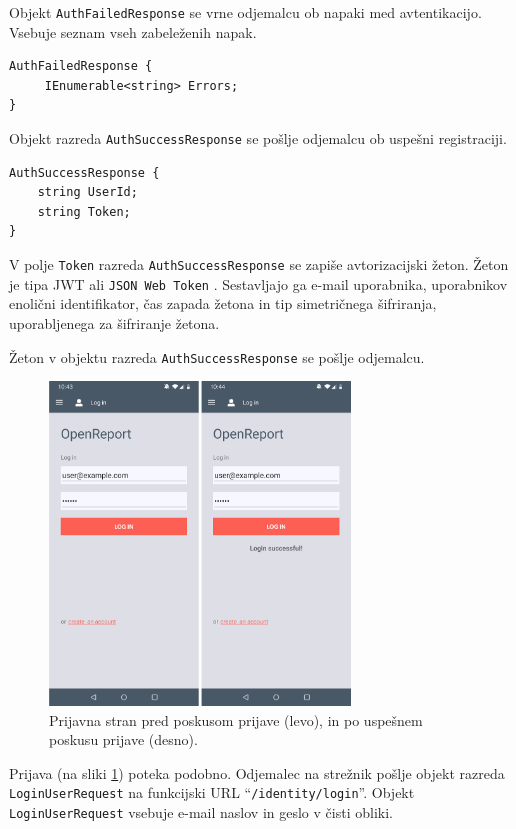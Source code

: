 \documentclass[a4paper, 12pt]{book}
\begin{document}
Objekt \texttt{AuthFailedResponse} se vrne odjemalcu ob napaki med avtentikacijo.
Vsebuje seznam vseh zabeleženih napak.

\begin{verbatim}
AuthFailedResponse { 
     IEnumerable<string> Errors; 
}
\end{verbatim}

Objekt razreda \texttt{AuthSuccessResponse} se pošlje odjemalcu ob uspešni registraciji.

\begin{verbatim}
AuthSuccessResponse { 
    string UserId; 
    string Token; 
} 
\end{verbatim}

V polje \texttt{Token} razreda \texttt{AuthSuccessResponse} se zapiše avtorizacijski žeton.
Žeton je tipa JWT ali \texttt{JSON Web Token} \cite{jwtinfo}.
Sestavljajo ga e-mail uporabnika, uporabnikov enolični identifikator, čas zapada žetona in tip simetričnega šifriranja, uporabljenega za šifriranje žetona.

Žeton v objektu razreda \texttt{AuthSuccessResponse} se pošlje odjemalcu.

\clearpage

\begin{figure}[H]
\begin{center}
\includegraphics[width=8cm]{app_login}
\end{center}
	\caption{Prijavna stran pred poskusom prijave (levo), in po uspešnem poskusu prijave (desno).}
\label{app_login}
\end{figure}

Prijava (na sliki \ref{app_login}) poteka podobno.
Odjemalec na strežnik pošlje objekt razreda \texttt{LoginUserRequest} na funkcijski URL \enquote{\texttt{/identity/login}}.
Objekt \texttt{LoginUserRequest} vsebuje e-mail naslov in geslo v čisti obliki.
\end{document}
